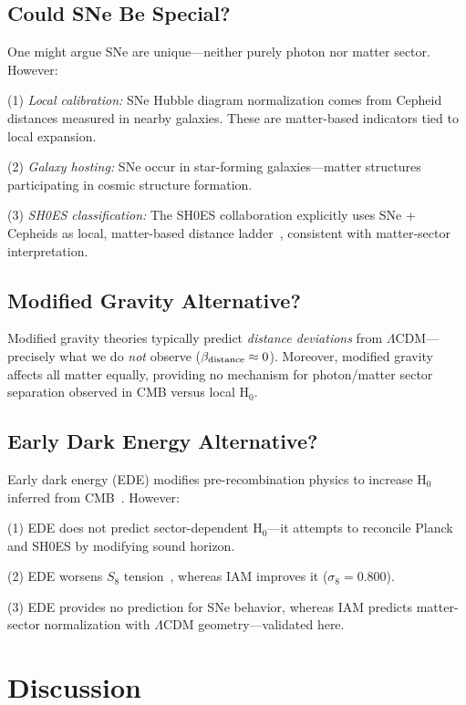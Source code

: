 \documentclass[twocolumn,superscriptaddress,prd,amsmath,amssymb]{revtex4-2}
\begin{document}
\subsection{Could SNe Be Special?}

One might argue SNe are unique—neither purely photon nor matter sector. However:

(1) \textit{Local calibration:} SNe Hubble diagram normalization comes from Cepheid distances measured in nearby galaxies. These are matter-based indicators tied to local expansion.

(2) \textit{Galaxy hosting:} SNe occur in star-forming galaxies—matter structures participating in cosmic structure formation.

(3) \textit{SH0ES classification:} The SH0ES collaboration explicitly uses SNe + Cepheids as local, matter-based distance ladder~\cite{Riess2022}, consistent with matter-sector interpretation.

\subsection{Modified Gravity Alternative?}

Modified gravity theories typically predict \textit{distance deviations} from $\Lambda$CDM—precisely what we do \textit{not} observe ($\beta_{\rm distance} \approx 0$). Moreover, modified gravity affects all matter equally, providing no mechanism for photon/matter sector separation observed in CMB versus local H$_0$.

\subsection{Early Dark Energy Alternative?}

Early dark energy (EDE) modifies pre-recombination physics to increase H$_0$ inferred from CMB~\cite{Kamionkowski2023}. However:

(1) EDE does not predict sector-dependent H$_0$—it attempts to reconcile Planck and SH0ES by modifying sound horizon.

(2) EDE worsens $S_8$ tension~\cite{Hill2020}, whereas IAM improves it ($\sigma_8 = 0.800$).

(3) EDE provides no prediction for SNe behavior, whereas IAM predicts matter-sector normalization with $\Lambda$CDM geometry—validated here.

\section{Discussion}
\end{document}
